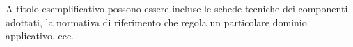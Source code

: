 \documentclass[12pt]{article}
\begin{document}
A titolo esemplificativo possono essere incluse le schede tecniche dei componenti adottati, la normativa di riferimento che regola un particolare dominio applicativo, ecc.
\fi

\newpage






\end{document}
